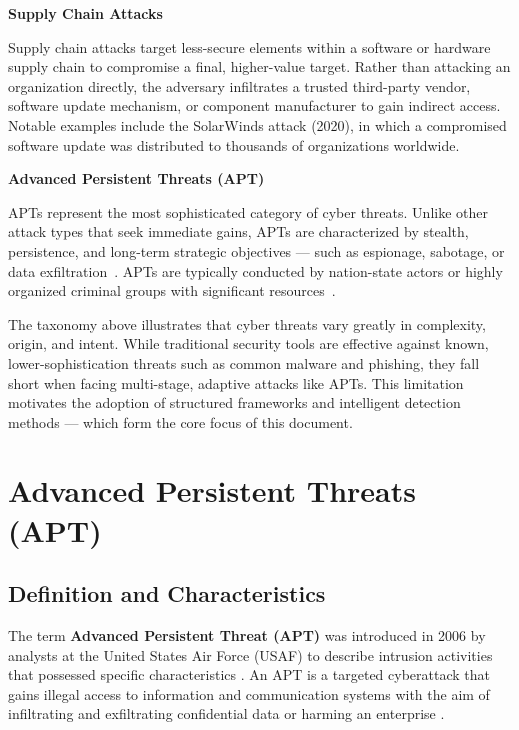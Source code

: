 \textbf{Supply Chain Attacks}\par
Supply chain attacks target less-secure elements within a software or hardware supply chain to compromise a final, higher-value target. Rather than attacking an organization directly, the adversary infiltrates a trusted third-party vendor, software update mechanism, or component manufacturer to gain indirect access. Notable examples include the SolarWinds attack (2020), in which a compromised software update was distributed to thousands of organizations worldwide.

\textbf{Advanced Persistent Threats (APT)}\par
APTs represent the most sophisticated category of cyber threats. Unlike other attack types that seek immediate gains, APTs are characterized by stealth, persistence, and long-term strategic objectives --- such as espionage, sabotage, or data exfiltration~\cite{krishnapriya2024comprehensive}. APTs are typically conducted by nation-state actors or highly organized criminal groups with significant resources~\cite{crowdstrike2024apt}.


The taxonomy above illustrates that cyber threats vary greatly in complexity, origin, and intent. While traditional security tools are effective against known, lower-sophistication threats such as common malware and phishing, they fall short when facing multi-stage, adaptive attacks like APTs. This limitation motivates the adoption of structured frameworks and intelligent detection methods --- which form the core focus of this document.

\section{Advanced Persistent Threats (APT)}
\subsection{Definition and Characteristics}
The term \textbf{Advanced Persistent Threat (APT)} was introduced in 2006 by analysts at the United States Air Force (USAF) to describe intrusion activities that possessed specific characteristics \cite{singh2016comprehensive}. An APT is a targeted cyberattack that gains illegal access to information and communication systems with the aim of infiltrating and exfiltrating confidential data or harming an enterprise \cite{krishnapriya2024comprehensive}.

